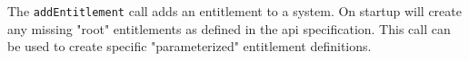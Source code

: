The \verb+addEntitlement+ call adds an entitlement to a \Rapture system. On startup \Rapture will
create any missing "root" entitlements as defined in the api specification. This call can be used to
create specific "parameterized" entitlement definitions.
